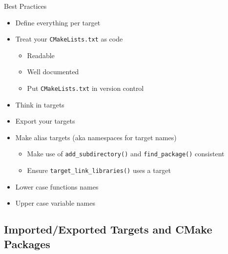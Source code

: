 \documentclass[t]{beamer}
\begin{document}
\begin{frame}{Best Practices}
    \begin{itemize}
        \item Define everything per target
        \item Treat your \texttt{CMakeLists.txt} as code
            \begin{itemize}
                \item Readable
                \item Well documented
                \item Put \texttt{CMakeLists.txt} in version control
            \end{itemize}
        \item Think in targets
        \item Export your targets
        \item Make alias targets (aka namespaces for target names)
            \begin{itemize}
                \item Make use of \texttt{add\_subdirectory()} and
                    \texttt{find\_package()} consistent
                \item Ensure \texttt{target\_link\_libraries()} uses a
                    target
            \end{itemize}
        \item Lower case functions names
        \item Upper case variable names
    \end{itemize}
\end{frame}

\subsection{Imported/Exported Targets and CMake Packages}
\end{document}
